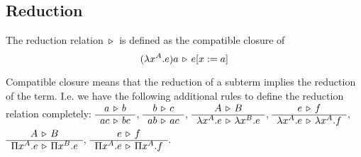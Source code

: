 \documentclass[12pt]{article}
\begin{document}
\subsection{Reduction}

\begin{definition}
  The reduction relation $\,\triangleright\,$ is defined as the compatible closure
  of
  $$
  (\lambda x^A. e) a \,\triangleright\, e[x:=a]
  $$
\end{definition}

Compatible closure means that the reduction of a subterm implies the reduction
of the term. I.e. we have the following additional rules to define the
reduction relation completely:
$\begin{array}{c} a \,\triangleright\, b \\ \hline ac \,\triangleright\, bc\end{array}$,
$\begin{array}{c} b \,\triangleright\, c \\ \hline ab \,\triangleright\, ac\end{array}$,
$\begin{array}{c} A \,\triangleright\, B \\ \hline \lambda x^A.e \,\triangleright\, \lambda x^B. e\end{array}$,
$\begin{array}{c} e \,\triangleright\, f \\ \hline \lambda x^A.e \,\triangleright\, \lambda x^A. f\end{array}$,
$\begin{array}{c} A \,\triangleright\, B \\ \hline \Pi x^A.e \,\triangleright\, \Pi x^B. e\end{array}$,
$\begin{array}{c} e \,\triangleright\, f \\ \hline \Pi x^A.e \,\triangleright\, \Pi x^A. f\end{array}$.
\end{document}
